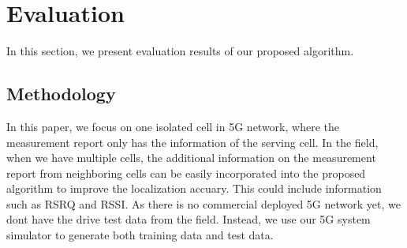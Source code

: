 \documentclass[conference, 10pt]{IEEEtran}
\begin{document}


\section{Evaluation}
\label{sec:eval}
In this section, we present evaluation results of our proposed algorithm. 
\subsection{Methodology}
In this paper, we focus on one isolated cell in 5G network, where the measurement report
only has the information of the serving cell. In the field, when we have multiple cells, the additional
information on the measurement report from neighboring cells can be easily incorporated into the proposed algorithm to improve the 
localization accuary. This could include information such as RSRQ and RSSI. As there is no commercial deployed 5G network yet, we dont have the drive test data from the field.
Instead, we use our 5G system simulator to generate both training data and test data.
\end{document}
